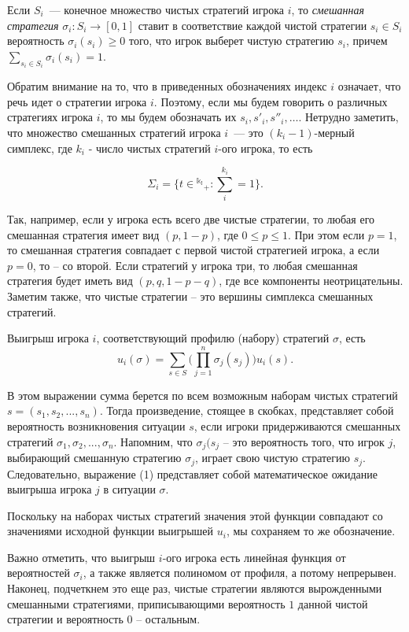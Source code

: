 \begin{definition}
Если $S_i$~--- конечное множество чистых стратегий игрока $i$, то
{\it смешанная стратегия} $\sigma_i:S_i\to [0,1]$ ставит в
соответствие каждой чистой стратегии $s_i\in S_i$ вероятность
$\sigma_i(s_i)\ge 0$ того, что игрок выберет чистую стратегию
$s_i$, причем $\sum_{s_i\in S_i}\sigma_i(s_i)=1$.
\end{definition}

Обратим внимание на то, что в приведенных обозначениях индекс $i$
означает, что речь идет о стратегии игрока $i$. Поэтому, если мы
будем говорить о различных стратегиях игрока $i$, то мы будем
обозначать их $s_i,s'_i,s''_i,\ldots$. Нетрудно заметить, что
множество смешанных стратегий игрока $i$~--- это $(k_i-1)$-мерный
симплекс, где $k_i$ - число чистых стратегий $i$-ого игрока, то
есть

$$\Sigma_i=\{t\in\mathbb{^{k_i}}_+:\sum^{k_i}_i=1\}.$$

Так, например, если  у игрока есть всего две чистые стратегии, то
любая его смешанная стратегия имеет вид $(p,1-p)$, где
$0\leq{p}\leq1$. При этом если $p=1$, то смешанная стратегия
совпадает с первой чистой стратегией игрока, а если $p=0$, то --
со второй. Если стратегий у игрока три, то любая смешанная
стратегия будет иметь вид $(p,q,1-p-q)$, где все компоненты
неотрицательны. Заметим также, что чистые стратегии -- это вершины
симплекса смешанных стратегий.

Выигрыш игрока $i$, соответствующий профилю (набору) стратегий
$\sigma$, есть \begin{equation}\label{P1} u_i(\sigma)=\sum_{s\in
S}\biggl (\prod^n_{j=1}\sigma_j(s_j)\biggr)u_i(s). \end{equation}

В этом выражении сумма берется по всем возможным наборам чистых
стратегий $s=(s_1,s_2,...,s_n)$. Тогда произведение, стоящее в
скобках, представляет собой вероятность возникновения ситуации
$s$, если игроки придерживаются смешанных стратегий
$\sigma_1,\sigma_2, ... ,\sigma_n$. Напомним, что $\sigma_j(s_j$
-- это вероятность того, что игрок $j$, выбирающий смешанную
стратегию $\sigma_j$, играет свою чистую стратегию $s_j$.
Следовательно, выражение (1) представляет собой математическое
ожидание выигрыша игрока $j$ в ситуации $\sigma $.

Поскольку на наборах чистых стратегий значения этой функции
совпадают со значениями исходной функции выигрышей $u_i$, мы
сохраняем то же обозначение.

Важно отметить, что выигрыш $i$-ого игрока есть линейная функция
от вероятностей $\sigma_i$, а также является полиномом от профиля,
а потому непрерывен. Наконец, подчеткнем это еще раз, чистые
стратегии являются вырожденными смешанными стратегиями,
приписывающими вероятность $1$ данной чистой стратегии и
вероятность $0$ -- остальным.

